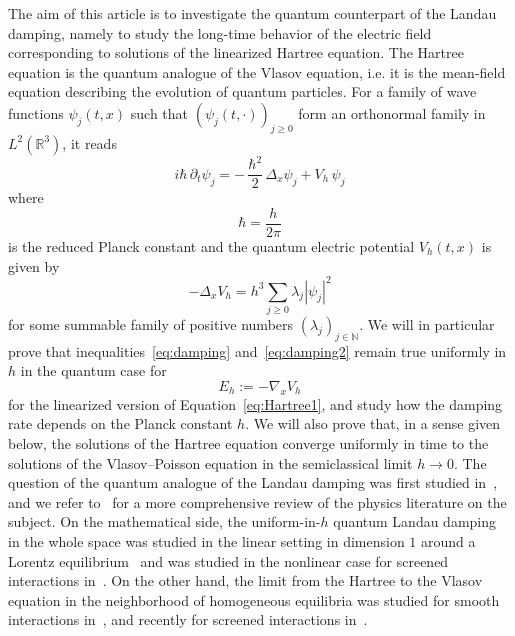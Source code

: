 \documentclass[a4paper,12pt]{amsart} %
\theoremstyle{plain}
\theoremstyle{definition}
\newcommand		{\N}		{\mathbb N}			%
\newcommand		{\RR}		{\mathbb R}			%
\newcommand		{\R}		{\RR}
\newcommand		{\Rd}		{\R^3}
\newcommand		{\hd}		{h^3}
\newcommand		{\lt}			{\left}				%
\newcommand		{\rt}			{\right}			%
\renewcommand	{\(}			{\lt(}
\renewcommand	{\)}			{\rt)}
\newcommand		{\n}[1]			{\lt\lvert{#1}\rt\rvert}	%
\newcommand			{\dpt}		{\partial_t}
\newcommand	{\h}			{h}
\begin{document}
	The aim of this article is to investigate the quantum counterpart of the Landau damping, namely to study the long-time behavior of the electric field corresponding to solutions of the linearized Hartree equation. The Hartree equation is the quantum analogue of the Vlasov equation, i.e. it is the mean-field equation describing the evolution of quantum particles. For a family of wave functions $\psi_j(t,x)$ such that $(\psi_j(t,\cdot))_{j\geq 0}$ form an orthonormal family in $L^2(\Rd)$, it reads
	\begin{equation}\label{eq:Hartree1}
		i\hbar\, \dpt \psi_j = -\,\frac{\hbar^2}{2}\, \Delta_x\psi_j + V_\h\,\psi_j
	\end{equation}
	where
	\begin{equation*}
		\hbar = \frac{h}{2\pi}
	\end{equation*}
	is the reduced Planck constant and the quantum electric potential $V_\h(t,x)$ is given by
	\begin{equation}\label{eq:Hartree2}
		-\Delta_x V_\h = \hd \sum_{j\geq 0} \lambda_j \n{\psi_j}^2
	\end{equation}
	for some summable family of positive numbers $(\lambda_j)_{j\in\N}$. We will in particular prove that inequalities~\eqref{eq:damping} and~\eqref{eq:damping2} remain true uniformly in $\h$ in the quantum case for 
	\begin{equation}\label{eq:Electric_field}
		E_\h := -\nabla_xV_\h
	\end{equation}
	for the linearized version of Equation~\eqref{eq:Hartree1}, and study how the damping rate depends on the Planck constant $h$. We will also prove that, in a sense given below, the solutions of the Hartree equation converge uniformly in time to the solutions of the Vlasov--Poisson equation in the semiclassical limit $h\to 0$. The question of the quantum analogue of the Landau damping was first studied in~\cite{klimontovich_spectra_1960, pines_approach_1962}, and we refer to~\cite{shukla_colloquium_2011} for a more comprehensive review of the physics literature on the subject. On the mathematical side, the uniform-in-$\h$ quantum Landau damping in the whole space was studied in the linear setting in dimension $1$ around a Lorentz equilibrium~\cite{gamba_note_2009} and was studied in the nonlinear case for screened interactions in~\cite{smith_phase_2024}. On the other hand, the limit from the Hartree to the Vlasov equation in the neighborhood of homogeneous equilibria was studied for smooth interactions in~\cite{lewin_hartree_2020}, and recently for screened interactions in~\cite{smith_semiclassical_2026}.
\end{document}
